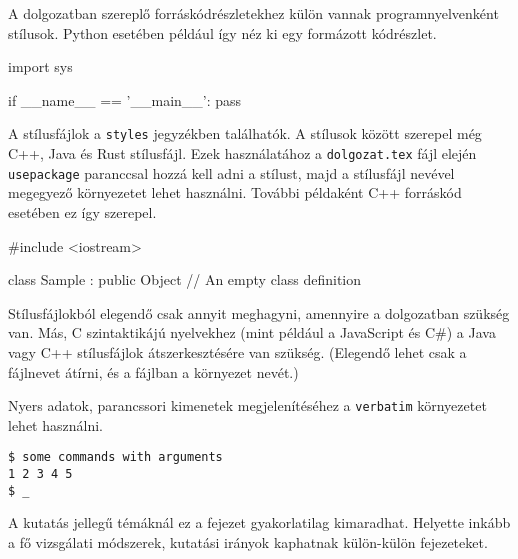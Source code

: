 A dolgozatban szereplő forráskódrészletekhez külön vannak programnyelvenként stílusok.
Python esetében például így néz ki egy formázott kódrészlet.
\begin{python}
import sys

if __name__ == '__main__':
    pass
\end{python}

A stílusfájlok a \texttt{styles} jegyzékben találhatók.
A stílusok között szerepel még C++, Java és Rust stílusfájl.
Ezek használatához a \texttt{dolgozat.tex} fájl elején \texttt{usepackage} paranccsal hozzá kell adni a stílust, majd a stílusfájl nevével megegyező környezetet lehet használni.
További példaként C++ forráskód esetében ez így szerepel.
\begin{cpp}
#include <iostream>

class Sample : public Object
{
    // An empty class definition
}
\end{cpp}
Stílusfájlokból elegendő csak annyit meghagyni, amennyire a dolgozatban szükség van.
Más, C szintaktikájú nyelvekhez (mint például a JavaScript és C\#) a Java vagy C++ stílusfájlok átszerkesztésére van szükség.
(Elegendő lehet csak a fájlnevet átírni, és a fájlban a környezet nevét.)

Nyers adatok, parancssori kimenetek megjelenítéséhez a \texttt{verbatim} környezetet lehet használni.
\begin{verbatim}
$ some commands with arguments
1 2 3 4 5
$ _
\end{verbatim}

A kutatás jellegű témáknál ez a fejezet gyakorlatilag kimaradhat.
Helyette inkább a fő vizsgálati módszerek, kutatási irányok kaphatnak külön-külön fejezeteket.
